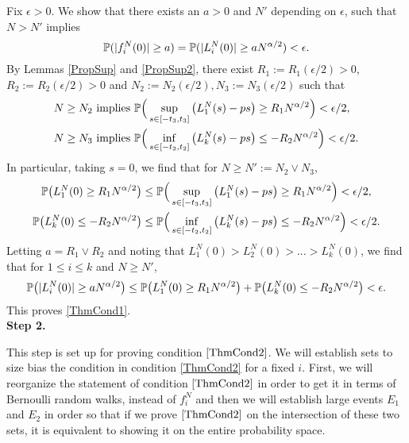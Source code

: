 	Fix $\epsilon>0$. We show that there exists an $a>0$ and $N'$ depending on $\epsilon$, such that $N>N'$ implies
	$$\mathbb{P}(|f^N_i(0)|\geq a) = \mathbb{P}(|L_i^N(0)|\geq a N^{\alpha/2})<\epsilon.$$
	By Lemmas \ref{PropSup} and \ref{PropSup2}, there exist $R_1 := R_1(\epsilon/2)>0$, $R_2 := R_2(\epsilon/2)>0$ and $N_2 := N_2(\epsilon/2),N_3 := N_3(\epsilon/2)$ such that 
	\begin{align*}
	N\geq N_2 &\text{ implies } \mathbb{P}\Big(\sup_{s\in[-t_3,t_3]}\left(L_1^N(s)-ps\right)\geq R_1N^{\alpha/2}\Big)<\epsilon/2,\\
	N\geq N_3 &\text{ implies } \mathbb{P}\Big(\inf_{s\in[-t_2,t_2]}\left(L_k^N(s)-ps\right)\leq -R_2 N^{\alpha/2}\Big)<\epsilon/2.
	\end{align*}
	In particular, taking $s=0$, we find that for $N\geq N' := N_2 \vee N_3$, 
	\begin{align*}
	\mathbb{P}\big(L_1^N(0)\geq R_1N^{\alpha/2}\big) &\leq \mathbb{P}\Big(\sup_{s\in[-t_3,t_3]}\left(L_1^N(s)-ps\right)\geq R_1N^{\alpha/2}\Big)< \epsilon/2,\\
	\mathbb{P}\big(L_k^N(0)\leq -R_2N^{\alpha/2}\big) &\leq \mathbb{P}\Big(\inf_{s\in[-t_2,t_2]}\left(L_k^N(s)-ps\right)\leq -R_2N^{\alpha/2}\Big)< \epsilon/2.
	\end{align*}
	Letting $a = R_1 \vee R_2$ and noting that $L_1^N(0)>L_2^N(0)>...>L_k^N(0)$, we find that for $1\leq i\leq k$ and $N \geq N'$,
	$$\mathbb{P}\big(|L_i^N(0)|\geq a N^{\alpha/2}\big)\leq \mathbb{P}\big(L_1^N(0)\geq R_1 N^{\alpha/2}\big) + \mathbb{P}\big(L_k^N(0)\leq -R_2N^{\alpha/2}\big) < \epsilon.$$
	This proves \eqref{ThmCond1}.\\
	
	\noindent\textbf{Step 2.} 
	
	This step is set up for proving condition $\eqref{ThmCond2}$. We will establish sets to size bias the condition in  condition \eqref{ThmCond2} for a fixed $i$. First, we will reorganize the statement of condition $\eqref{ThmCond2}$ in order to get it in terms of Bernoulli random walks, instead of $f_i^N$ and then we will establish large events $E_1$ and $E_2$ in order so that if we prove $\eqref{ThmCond2}$ on the intersection of these two sets, it is equivalent to showing it on the entire probability space.
	
